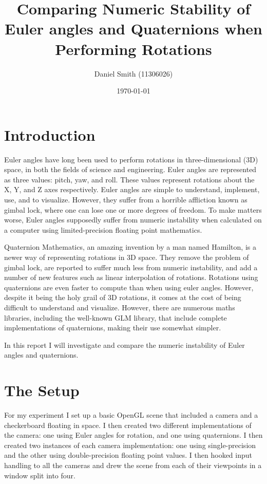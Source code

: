 \documentclass[a4paper]{article}
\title{Comparing Numeric Stability of Euler angles and Quaternions when Performing Rotations}
\author{Daniel Smith (11306026)}
\date{\today}
\begin{document}
\maketitle

\section{Introduction}

Euler angles have long been used to perform rotations in three-dimensional (3D) space, in both the fields of science and engineering. Euler angles are represented as three values: pitch, yaw, and roll. These values represent rotations about the X, Y, and Z axes respectively. Euler angles are simple to understand, implement, use, and to visualize. However, they suffer from a horrible affliction known as gimbal lock, where one can lose one or more degrees of freedom. To make matters worse, Euler angles supposedly suffer from numeric instability when calculated on a computer using limited-precision floating point mathematics.

Quaternion Mathematics, an amazing invention by a man named Hamilton, is a newer way of representing rotations in 3D space. They remove the problem of gimbal lock, are reported to suffer much less from numeric instability, and add a number of new features such as linear interpolation of rotations. Rotations using quaternions are even faster to compute than when using euler angles. However, despite it being the holy grail of 3D rotations, it comes at the cost of being difficult to understand and visualize. However, there are numerous maths libraries, including the well-known GLM library, that include complete implementations of quaternions, making their use somewhat simpler.

In this report I will investigate and compare the numeric instability of Euler angles and quaternions.

\section{The Setup}

For my experiment I set up a basic OpenGL scene that included a camera and a checkerboard floating in space. I then created two different implementations of the camera: one using Euler angles for rotation, and one using quaternions. I then created two instances of each camera implementation: one using single-precision and the other using double-precision floating point values. I then hooked input handling to all the cameras and drew the scene from each of their viewpoints in a window split into four.
\end{document}
